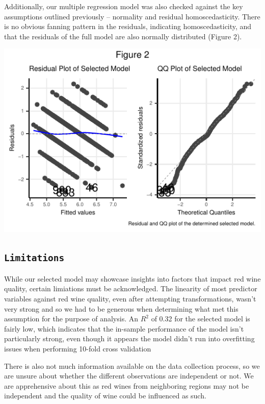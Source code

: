 \documentclass[letterpaper,8pt,twocolumn,twoside,]{pinp}
\begin{document}
Additionally, our multiple regression model was also checked against the
key assumptions outlined previously -- normality and residual
homoscedasticity. There is no obvious fanning pattern in the residuals,
indicating homoscedasticity, and that the residuals of the full model
are also normally distributed (Figure 2).

\begin{center}\includegraphics{pinp_files/figure-latex/unnamed-chunk-3-1} \end{center}

\hypertarget{limitations}{%
\subsection{\texorpdfstring{\texttt{Limitations}}{Limitations}}\label{limitations}}

While our selected model may showcase insights into factors that impact
red wine quality, certain limiations must be acknowledged. The linearity
of most predictor variables against red wine quality, even after
attempting transformations, wasn't very strong and so we had to be
generous when determining what met this assumption for the purpose of
analysis. An \(R^2\) of 0.32 for the selected model is fairly low, which
indicates that the in-sample performance of the model isn't particularly
strong, even though it appears the model didn't run into overfitting
issues when performing 10-fold cross validation

There is also not much information available on the data collection
process, so we are unsure about whether the different observations are
independent or not. We are apprehensive about this as red wines from
neighboring regions may not be independent and the quality of wine could
be influenced as such.
\end{document}
